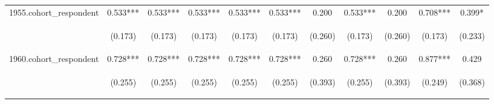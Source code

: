 \begin{center}
\begin{tabular}{lcccccccccc}
1955.cohort\_respondent & 0.533*** & 0.533*** & 0.533*** & 0.533*** & 0.533*** & 0.200 & 0.533*** & 0.200 & 0.708*** & 0.399* \\
\vspace{4pt} & \begin{footnotesize}(0.173)\end{footnotesize} & \begin{footnotesize}(0.173)\end{footnotesize} & \begin{footnotesize}(0.173)\end{footnotesize} & \begin{footnotesize}(0.173)\end{footnotesize} & \begin{footnotesize}(0.173)\end{footnotesize} & \begin{footnotesize}(0.260)\end{footnotesize} & \begin{footnotesize}(0.173)\end{footnotesize} & \begin{footnotesize}(0.260)\end{footnotesize} & \begin{footnotesize}(0.173)\end{footnotesize} & \begin{footnotesize}(0.233)\end{footnotesize} \\
1960.cohort\_respondent & 0.728*** & 0.728*** & 0.728*** & 0.728*** & 0.728*** & 0.260 & 0.728*** & 0.260 & 0.877*** & 0.429 \\
\vspace{4pt} & \begin{footnotesize}(0.255)\end{footnotesize} & \begin{footnotesize}(0.255)\end{footnotesize} & \begin{footnotesize}(0.255)\end{footnotesize} & \begin{footnotesize}(0.255)\end{footnotesize} & \begin{footnotesize}(0.255)\end{footnotesize} & \begin{footnotesize}(0.393)\end{footnotesize} & \begin{footnotesize}(0.255)\end{footnotesize} & \begin{footnotesize}(0.393)\end{footnotesize} & \begin{footnotesize}(0.249)\end{footnotesize} & \begin{footnotesize}(0.368)\end{footnotesize} \\

\end{tabular}
\end{center}
